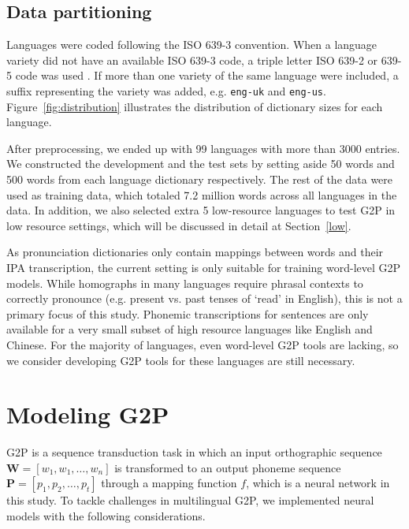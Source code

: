 \documentclass[a4paper]{article}
\begin{document}
\subsection{Data partitioning}
Languages were coded following the ISO 639-3 convention. When a language variety did not have an available ISO 639-3 code, a triple letter ISO 639-2 or 639-5 code was used \cite{iso_download}. If more than one variety of the same language were included, a suffix representing the variety was added, e.g. \texttt{eng-uk} and \texttt{eng-us}. Figure~\ref{fig:distribution} illustrates the distribution of dictionary sizes for each language. 

After preprocessing, we ended up with 99 languages with more than 3000 entries. 
We constructed the development and the test sets by setting aside 50 words and 500 words from each language dictionary respectively. The rest of the data were used as training data, which totaled 7.2 million words across all languages in the data. In addition, we also selected extra 5 low-resource languages to test G2P in low resource settings, which will be discussed in detail at Section~\ref{low}.

As pronunciation dictionaries only contain mappings between words and their IPA transcription, the current setting is only suitable for training word-level G2P models. While homographs in many languages require phrasal contexts to correctly pronounce (e.g. present vs. past tenses of `read' in English), this is not a primary focus of this study. Phonemic transcriptions for sentences are only available for a very small subset of high resource languages like English and Chinese. For the majority of languages, even word-level G2P tools are lacking, so we consider developing G2P tools for these languages are still necessary. 


\section{Modeling G2P}
G2P is a sequence transduction task in which an input orthographic sequence $\boldsymbol{W}=[w_1,w_1,\dots,w_n]$ is transformed to an output phoneme sequence $\boldsymbol{P}=[p_1,p_2,\dots,p_t]$ through a mapping function $f$, which is a neural network in this study. To tackle challenges in multilingual G2P, we implemented neural models with the following considerations. 
\end{document}
